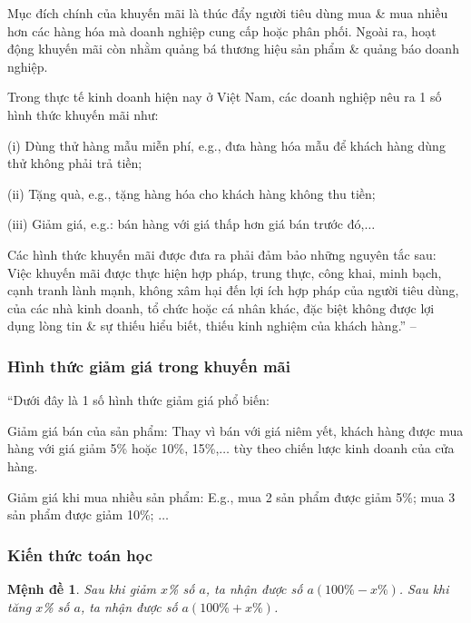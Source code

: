 \documentclass[oneside]{book}
\numberwithin{equation}{section}
\newtheorem{menhde}{Mệnh đề}[section]
\begin{document}
Mục đích chính của khuyến mãi là thúc đẩy người tiêu dùng mua \& mua nhiều hơn các hàng hóa mà doanh nghiệp cung cấp hoặc phân phối. Ngoài ra, hoạt động khuyến mãi còn nhằm quảng bá thương hiệu sản phẩm \& quảng báo doanh nghiệp.

Trong thực tế kinh doanh hiện nay ở Việt Nam, các doanh nghiệp nêu ra 1 số hình thức khuyến mãi như:
\begin{enumerate*}
	\item[(i)] Dùng thử hàng mẫu miễn phí, e.g., đưa hàng hóa mẫu để khách hàng dùng thử không phải trả tiền;
	\item[(ii)] Tặng quà, e.g., tặng hàng hóa cho khách hàng không thu tiền;
	\item[(iii)] Giảm giá, e.g.: bán hàng với giá thấp hơn giá bán trước đó,$\ldots$
\end{enumerate*}
Các hình thức khuyến mãi được đưa ra phải đảm bảo những nguyên tắc sau: Việc khuyến mãi được thực hiện hợp pháp, trung thực, công khai, minh bạch, cạnh tranh lành mạnh, không xâm hại đến lợi ích hợp pháp của người tiêu dùng, của các nhà kinh doanh, tổ chức hoặc cá nhân khác, đặc biệt không được lợi dụng lòng tin \& sự thiếu hiểu biết, thiếu kinh nghiệm của khách hàng.'' -- \cite[p. 71]{SGK_Toan_7_Canh_Dieu_tap_1}

\subsubsection{Hình thức giảm giá trong khuyến mãi}
``Dưới đây là 1 số hình thức giảm giá phổ biến:
\begin{enumerate*}
	\item Giảm giá bán của sản phẩm: Thay vì bán với giá niêm yết, khách hàng được mua hàng với giá giảm 5\% hoặc 10\%, 15\%,$\ldots$ tùy theo chiến lược kinh doanh của cửa hàng.
	\item Giảm giá khi mua nhiều sản phẩm: E.g., mua 2 sản phẩm được giảm 5\%; mua 3 sản phẩm được giảm 10\%; $\ldots$
\end{enumerate*}

\subsubsection{Kiến thức toán học}

\begin{menhde}
	Sau khi giảm $x$\% số $a$, ta nhận được số $a(100\% - x\%)$. Sau khi tăng $x$\% số $a$, ta nhận được số $a(100\% + x\%)$.
\end{menhde}
\end{document}
